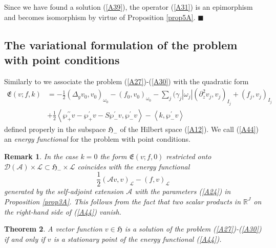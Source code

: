 \documentclass[11pt]{article}%
\newtheorem{theorem}{Theorem}
\newtheorem{remark}[theorem]{Remark}
\numberwithin{equation}{section}
\begin{document}
Since we have found a solution (\ref{A39}), the operator (\ref{A31}) is an
epimorphism and becomes isomorphism by virtue of Proposition \ref{prop5A}.
$\blacksquare$

\subsection{The variational formulation of the problem with point
conditions\label{sect2.5}}

Similarly to \cite{na188, na239, na504} we associate the problem
(\ref{A27})-(\ref{A30}) with the quadratic form%
\begin{align}
\mathfrak{E}(v;f,k)  &  =-\frac{1}{2}(\Delta_{y}v_{0},v_{0})_{\omega_{0}%
}-(f_{0},v_{0})_{\omega_{0}}-\sum\nolimits_{j}(\gamma_{j}|\omega_{j}%
|(\partial_{z}^{2}v_{j},v_{j})_{I_{j}}+(f_{j},v_{j})_{I_{j}}\label{A44}\\
&  +\frac{1}{2}\left\langle \wp_{+}^{\prime\prime}v-\wp_{+}^{\prime}v-S\wp
_{-}^{\prime}v,\wp_{-}^{\prime}v\right\rangle -\left\langle k,\wp_{-}^{\prime
}v\right\rangle \nonumber
\end{align}
defined properly in the subspace $\mathfrak{H}_{-}$ of the Hilbert space
(\ref{A12}). We call (\ref{A44}) an \textit{energy functional} for the problem
with point conditions.

\begin{remark}
\label{remENER}In the case $k=0$ the form $\mathfrak{E}(v;f,0)$ restricted
onto $\mathcal{D}(\mathcal{A})\times\mathcal{L}\subset\mathfrak{H}_{-}%
\times\mathcal{L}$ coincides with the energy functional%
\[
\frac{1}{2}(\mathcal{A}v,v)_{\mathcal{L}}-(f,v)_{\mathcal{L}}%
\]
generated by the self-adjoint extension $\mathcal{A}$ with the parameters
(\ref{A24}) in Proposition \ref{prop3A}. This follows from the fact that two
scalar products in $\mathbb{R}^{J}$ on the right-hand side of (\ref{A44}) vanish.
\end{remark}

\begin{theorem}
\label{th7A}A vector function $v\in\mathfrak{H}$ is a solution of the problem
(\ref{A27})-(\ref{A30}) if and only if $v$ is a stationary point of the energy
functional (\ref{A44}).
\end{theorem}
\end{document}
